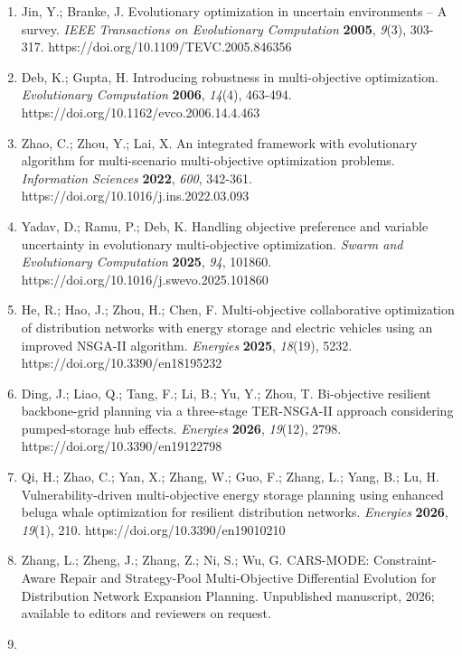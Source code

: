 \documentclass[
  10pt,
  a4paper,
]{article}
\begin{document}
\begin{enumerate}
  state-of-the-art. \emph{IEEE Transactions on Evolutionary Computation}
  \textbf{2011}, \emph{15}(1), 4-31.
  https://doi.org/10.1109/TEVC.2010.2059031
\item
  Jin, Y.; Branke, J. Evolutionary optimization in uncertain
  environments -- A survey. \emph{IEEE Transactions on Evolutionary
  Computation} \textbf{2005}, \emph{9}(3), 303-317.
  https://doi.org/10.1109/TEVC.2005.846356
\item
  Deb, K.; Gupta, H. Introducing robustness in multi-objective
  optimization. \emph{Evolutionary Computation} \textbf{2006},
  \emph{14}(4), 463-494. https://doi.org/10.1162/evco.2006.14.4.463
\item
  Zhao, C.; Zhou, Y.; Lai, X. An integrated framework with evolutionary
  algorithm for multi-scenario multi-objective optimization problems.
  \emph{Information Sciences} \textbf{2022}, \emph{600}, 342-361.
  https://doi.org/10.1016/j.ins.2022.03.093
\item
  Yadav, D.; Ramu, P.; Deb, K. Handling objective preference and
  variable uncertainty in evolutionary multi-objective optimization.
  \emph{Swarm and Evolutionary Computation} \textbf{2025}, \emph{94},
  101860. https://doi.org/10.1016/j.swevo.2025.101860
\item
  He, R.; Hao, J.; Zhou, H.; Chen, F. Multi-objective collaborative
  optimization of distribution networks with energy storage and electric
  vehicles using an improved NSGA-II algorithm. \emph{Energies}
  \textbf{2025}, \emph{18}(19), 5232. https://doi.org/10.3390/en18195232
\item
  Ding, J.; Liao, Q.; Tang, F.; Li, B.; Yu, Y.; Zhou, T. Bi-objective
  resilient backbone-grid planning via a three-stage TER-NSGA-II
  approach considering pumped-storage hub effects. \emph{Energies}
  \textbf{2026}, \emph{19}(12), 2798. https://doi.org/10.3390/en19122798
\item
  Qi, H.; Zhao, C.; Yan, X.; Zhang, W.; Guo, F.; Zhang, L.; Yang, B.;
  Lu, H. Vulnerability-driven multi-objective energy storage planning
  using enhanced beluga whale optimization for resilient distribution
  networks. \emph{Energies} \textbf{2026}, \emph{19}(1), 210.
  https://doi.org/10.3390/en19010210
\item
  Zhang, L.; Zheng, J.; Zhang, Z.; Ni, S.; Wu, G. CARS-MODE:
  Constraint-Aware Repair and Strategy-Pool Multi-Objective Differential
  Evolution for Distribution Network Expansion Planning. Unpublished
  manuscript, 2026; available to editors and reviewers on request.
\item

\end{enumerate}
\end{document}
